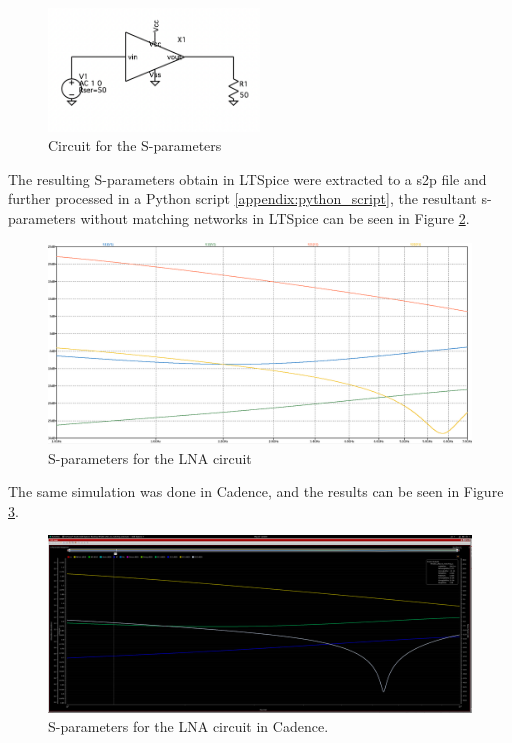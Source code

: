 \begin{figure}[H]
    \centering
    \includegraphics[width=0.5\textwidth]{Images/S-paramCircuit.png}
    \caption{Circuit for the S-parameters}
    \label{fig:SIMS-paramCircuit}
\end{figure}

The resulting S-parameters obtain in LTSpice were extracted to a s2p file and further processed in a Python script \ref{appendix:python_script}, the resultant s-parameters without matching networks in LTSpice can be seen in Figure \ref{fig:SimS-param}.

\begin{figure}[H]
    \centering
    \includegraphics[width=1\textwidth]{Images/SIM-s-param-nomatch.png}
    \caption{S-parameters for the LNA circuit}
    \label{fig:SimS-param}
\end{figure}

The same simulation was done in Cadence, and the results can be seen in Figure \ref{fig:CadenceS-param}.
\begin{figure}[H]
    \centering
    \includegraphics[width=1\textwidth]{Images/cad-s-param-no-match.png}
    \caption{S-parameters for the LNA circuit in Cadence.}
    \label{fig:CadenceS-param}
\end{figure}

